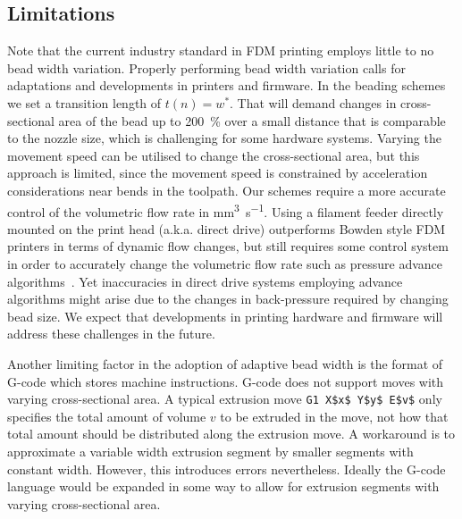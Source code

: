 \subsection{Limitations}
Note that the current industry standard in FDM printing employs little to no bead width variation.
Properly performing bead width variation calls for adaptations and developments in printers and firmware.
In the beading schemes we set a transition length of $t(n) = w^*$.
That will demand changes in cross-sectional area of the bead up to \SI{200}{\percent} over a small distance that is comparable to the nozzle size, which is challenging for some hardware systems.
Varying the movement speed can be utilised to change the cross-sectional area, but this approach is limited, since the movement speed is constrained by acceleration considerations near bends in the toolpath.
Our schemes require a more accurate control of the volumetric flow rate in \si{\milli\meter\cubed\per\second}.
Using a filament feeder directly mounted on the print head (a.k.a. direct drive) outperforms Bowden style FDM printers in terms of dynamic flow changes,
but still requires some control system in order to accurately change the volumetric flow rate such as pressure advance algorithms~\cite{tronvoll2019investigating}.
Yet inaccuracies in direct drive systems employing advance algorithms might arise due to the changes in back-pressure required by changing bead size.
We expect that developments in printing hardware and firmware will address these challenges in the future.


Another limiting factor in the adoption of adaptive bead width is the format of G-code which stores machine instructions.
G-code does not support moves with varying cross-sectional area.
A typical extrusion move \lstinline{G1 X$x$ Y$y$ E$v$} only specifies the total amount of volume $v$ to be extruded in the move, not how that total amount should be distributed along the extrusion move.
A workaround is to approximate a variable width extrusion segment by smaller segments with constant width.
However, this introduces errors nevertheless.
Ideally the G-code language would be expanded in some way to allow for extrusion segments with varying cross-sectional area.






